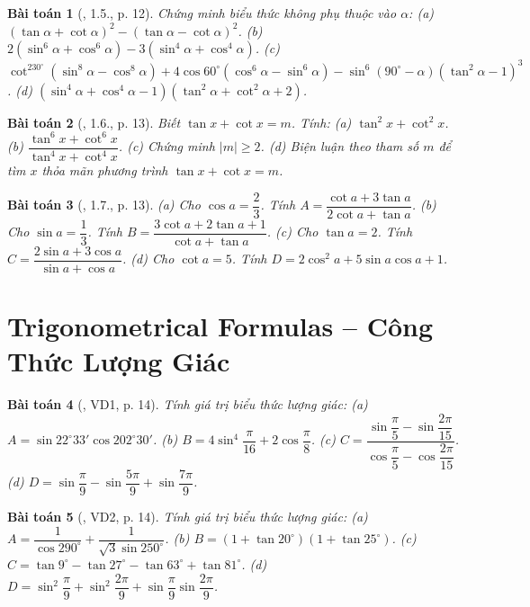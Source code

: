 \documentclass{article}
\newtheorem{baitoan}{Bài toán}
\begin{document}
\begin{baitoan}[\cite{Hung_nang_cao_phat_trien_Toan_11_tap_1}, 1.5., p. 12]
	Chứng minh biểu thức không phụ thuộc vào $\alpha$: (a) $(\tan\alpha + \cot\alpha)^2 - (\tan\alpha - \cot\alpha)^2$. (b) $2(\sin^6\alpha + \cos^6\alpha) - 3(\sin^4\alpha + \cos^4\alpha)$. (c) $\cot^230^\circ(\sin^8\alpha - \cos^8\alpha) + 4\cos60^\circ(\cos^6\alpha - \sin^6\alpha) - \sin^6(90^\circ - \alpha)(\tan^2\alpha - 1)^3$. (d) $(\sin^4\alpha + \cos^4\alpha - 1)(\tan^2\alpha + \cot^2\alpha + 2)$.
\end{baitoan}

\begin{baitoan}[\cite{Hung_nang_cao_phat_trien_Toan_11_tap_1}, 1.6., p. 13]
	Biết $\tan x + \cot x = m$. Tính: (a) $\tan^2x + \cot^2x$. (b) $\dfrac{\tan^6x + \cot^6x}{\tan^4x + \cot^4x}$. (c) Chứng minh $|m|\ge2$. (d) Biện luận theo tham số $m$ để tìm $x$ thỏa mãn phương trình $\tan x + \cot x = m$.
\end{baitoan}

\begin{baitoan}[\cite{Hung_nang_cao_phat_trien_Toan_11_tap_1}, 1.7., p. 13]
	(a) Cho $\cos a = \dfrac{2}{3}$. Tính $A = \dfrac{\cot a + 3\tan a}{2\cot a + \tan a}$. (b) Cho $\sin a = \dfrac{1}{3}$. Tính $B = \dfrac{3\cot a + 2\tan a + 1}{\cot a + \tan a}$. (c) Cho $\tan a = 2$. Tính $C = \dfrac{2\sin a + 3\cos a}{\sin a + \cos a}$. (d) Cho $\cot a = 5$. Tính $D = 2\cos^2a + 5\sin a\cos a + 1$.
\end{baitoan}


\section{Trigonometrical Formulas -- Công Thức Lượng Giác}

\begin{baitoan}[\cite{Hung_nang_cao_phat_trien_Toan_11_tap_1}, VD1, p. 14]
	Tính giá trị biểu thức lượng giác: (a) $A = \sin22^\circ33'\cos202^\circ30'$. (b) $B = 4\sin^4\dfrac{\pi}{16} + 2\cos\dfrac{\pi}{8}$. (c) $C = \dfrac{\sin\dfrac{\pi}{5} - \sin\dfrac{2\pi}{15}}{\cos\dfrac{\pi}{5} - \cos\dfrac{2\pi}{15}}$. (d) $D = \sin\dfrac{\pi}{9} - \sin\dfrac{5\pi}{9} + \sin\dfrac{7\pi}{9}$.
\end{baitoan}

\begin{baitoan}[\cite{Hung_nang_cao_phat_trien_Toan_11_tap_1},  VD2, p. 14]
	Tính giá trị biểu thức lượng giác: (a) $A = \dfrac{1}{\cos290^\circ} + \dfrac{1}{\sqrt{3}\sin250^\circ}$. (b) $B = (1 + \tan20^\circ)(1 + \tan25^\circ)$. (c) $C = \tan9^\circ - \tan27^\circ - \tan63^\circ + \tan81^\circ$. (d) $D = \sin^2\dfrac{\pi}{9} + \sin^2\dfrac{2\pi}{9} + \sin\dfrac{\pi}{9}\sin\dfrac{2\pi}{9}$. 
\end{baitoan}
\end{document}
